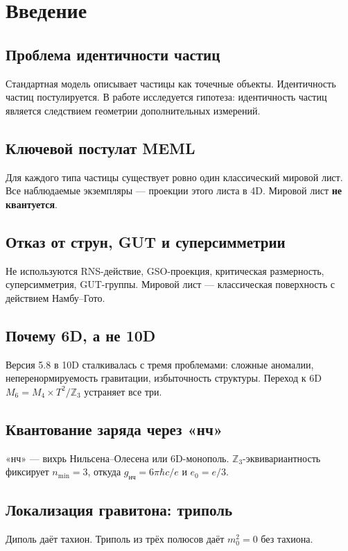 \documentclass[11pt,letterpaper]{article}
\begin{document}
\section{Введение}

\subsection{Проблема идентичности частиц}
Стандартная модель описывает частицы как точечные объекты. Идентичность частиц постулируется. В работе исследуется гипотеза: идентичность частиц является следствием геометрии дополнительных измерений.

\subsection{Ключевой постулат MEML}
Для каждого типа частицы существует ровно один классический мировой лист. Все наблюдаемые экземпляры --- проекции этого листа в 4D. Мировой лист \textbf{не квантуется}.

\subsection{Отказ от струн, GUT и суперсимметрии}
Не используются RNS-действие, GSO-проекция, критическая размерность, суперсимметрия, GUT-группы. Мировой лист --- классическая поверхность с действием Намбу--Гото.

\subsection{Почему 6D, а не 10D}
Версия 5.8 в 10D сталкивалась с тремя проблемами: сложные аномалии, неперенормируемость гравитации, избыточность структуры. Переход к 6D $M_6 = M_4 \times T^2/\mathbb{Z}_3$ устраняет все три.

\subsection{Квантование заряда через «нч»}
«нч» --- вихрь Нильсена--Олесена или 6D-монополь. $\mathbb{Z}_3$-эквивариантность фиксирует $n_{\min} = 3$, откуда $g_{\text{нч}} = 6\pi\hbar c/e$ и $e_0 = e/3$.

\subsection{Локализация гравитона: триполь}
Диполь даёт тахион. Триполь из трёх полюсов даёт $m_0^2 = 0$ без тахиона.
\end{document}
